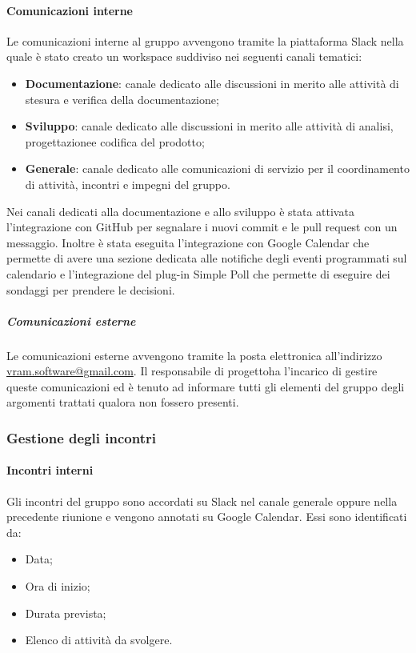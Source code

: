 			\paragraph*{Comunicazioni interne}
				Le comunicazioni interne al gruppo avvengono tramite la piattaforma Slack nella quale è stato creato un workspace suddiviso nei seguenti canali tematici:
				\begin{itemize}
					\item \textbf{Documentazione}: canale dedicato alle discussioni in merito alle attività di stesura e verifica della documentazione;
					\item \textbf{Sviluppo}: canale dedicato alle discussioni in merito alle attività di analisi, progettazione\glosp e codifica del prodotto\glo;
					\item \textbf{Generale}: canale dedicato alle comunicazioni di servizio per il coordinamento di attività, incontri e impegni del gruppo.
				\end{itemize}
				Nei canali dedicati alla documentazione e allo sviluppo è stata attivata l'integrazione con GitHub per segnalare i nuovi commit e le pull request con un messaggio.
				Inoltre è stata eseguita l'integrazione con Google Calendar che permette di avere una sezione dedicata alle notifiche degli eventi programmati sul calendario e l'integrazione del plug-in Simple Poll che permette di eseguire dei sondaggi per prendere le decisioni.
			\subparagraph*{Comunicazioni esterne}
				Le comunicazioni esterne avvengono tramite la posta elettronica all'indirizzo \url{vram.software@gmail.com}.
				Il responsabile di progetto\glosp ha l'incarico di gestire queste comunicazioni ed è tenuto ad informare tutti gli elementi del gruppo degli argomenti trattati qualora non fossero presenti.
		\subsubsection{Gestione degli incontri}
			\paragraph*{Incontri interni}
				Gli incontri del gruppo sono accordati su Slack nel canale generale oppure nella precedente riunione e vengono annotati su Google Calendar. Essi sono identificati da:
				\begin{itemize}
					\item Data;
					\item Ora di inizio;
					\item Durata prevista;
					\item Elenco di attività da svolgere.
				\end{itemize}
